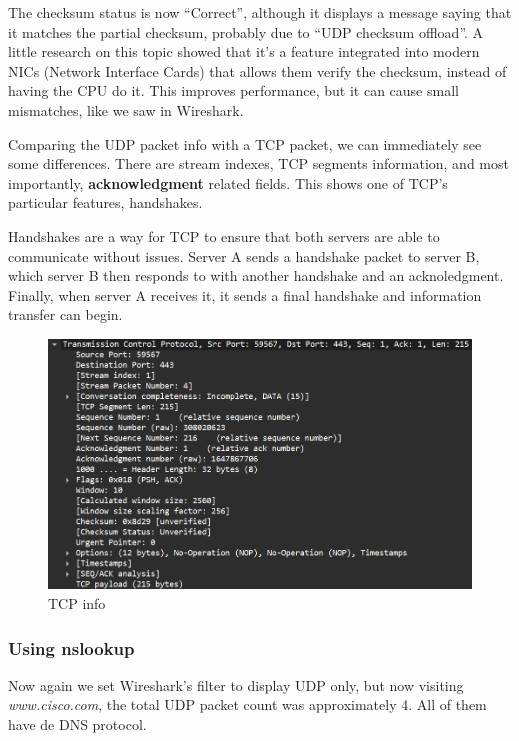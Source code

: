 The checksum status is now ``Correct'', although it displays a message saying
that it matches the partial checksum, probably due to ``UDP checksum offload''.
A little research on this topic showed that it's a feature integrated into
modern NICs (Network Interface Cards) that allows them verify the checksum,
instead of having the CPU do it. This improves performance, but it can cause
small mismatches, like we saw in Wireshark.

Comparing the UDP packet info with a TCP packet, we can immediately see some
differences. There are stream indexes, TCP segments information, and most
importantly, \textbf{acknowledgment} related fields. This shows one of TCP's
particular features, handshakes.

Handshakes are a way for TCP to ensure that both servers are able to
communicate without issues. Server A sends a handshake packet to server B,
which server B then responds to with another handshake and an acknoledgment.
Finally, when server A receives it, it sends a final handshake and information
transfer can begin.

\begin{figure}[htbp]
	\centering
	\includegraphics[width=1\linewidth]{img/6.png}
	\caption{TCP info}\label{fig:6}
\end{figure}

\subsubsection{Using nslookup}

Now again we set Wireshark's filter to display UDP only, but now visiting
\textit{www.cisco.com}, the total UDP packet count was approximately 4. All of
them have de DNS protocol.\@

